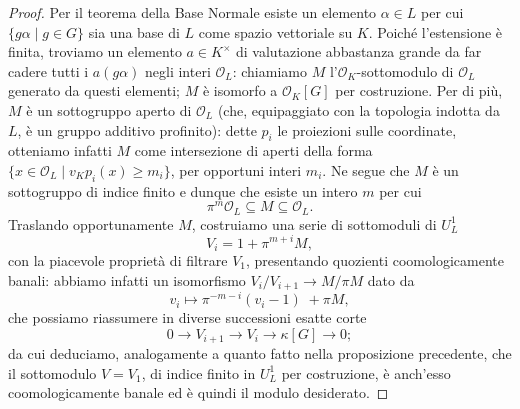 \begin{proof}
	Per il teorema della Base Normale esiste un elemento $ \alpha \in L $ per cui $ \{ g\alpha \mid g \in G \} $ sia una base di $ L $ come spazio vettoriale su $ K $. Poiché l'estensione è finita, troviamo un elemento $ a \in K^\times $ di valutazione abbastanza grande da far cadere tutti i $ a (g\alpha) $ negli interi $ \mathcal{O}_L $: chiamiamo $ M $ l'$ \mathcal{O}_K $-sottomodulo di $ \mathcal{O}_L $ generato da questi elementi; $ M $ è isomorfo a $ \mathcal{O}_K[G] $ per costruzione.  
	Per di più, $ M $ è un sottogruppo aperto di $ \mathcal{O}_L $ (che, equipaggiato con la topologia indotta da $ L $, è un gruppo additivo profinito): dette $ p_i $ le proiezioni sulle coordinate, otteniamo infatti $ M $ come intersezione di aperti della forma $ \{ x \in \mathcal{O}_L \mid v_K p_i (x) \geq m_i\} $, per opportuni interi $ m_i $. Ne segue che $ M $ è un sottogruppo di indice finito e dunque che esiste un intero $ m $ per cui
	\[  \pi^m\mathcal{O}_L\subseteq M \subseteq \mathcal{O}_L. \]
	Traslando opportunamente $ M $, costruiamo una serie di sottomoduli di $ U_L^1 $ 
	\[ V_i = 1 + \pi^{m+i}M, \]
	con la piacevole proprietà di filtrare $ V_1 $, presentando quozienti coomologicamente banali: abbiamo infatti un isomorfismo $ V_i/V_{i+1} \to M/\pi M $ dato da $$  v_i \mapsto \pi^{-m-i}(v_i-1) \; +\pi M,  $$ che possiamo riassumere in diverse successioni esatte corte
	\[ 0 \to V_{i+1} \to V_i \to \kappa [G] \to 0; \]
	da cui deduciamo, analogamente a quanto fatto nella proposizione precedente, che il sottomodulo $ V= V_1 $, di indice finito in $ U_L^1 $ per costruzione, è anch'esso coomologicamente banale ed è quindi il modulo desiderato.
\end{proof}


